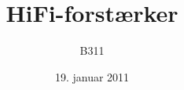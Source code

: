 

\title{HiFi-forstærker}
\author{B311}
\date{19. januar 2011}


\frame{\titlepage}




















